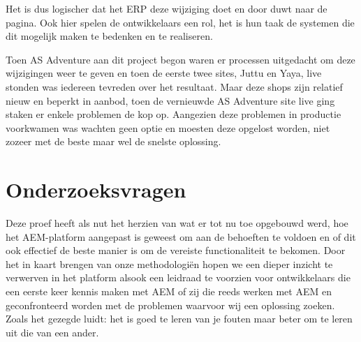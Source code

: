 	Het is dus logischer dat het ERP deze wijziging doet en door duwt naar de pagina. Ook hier spelen de ontwikkelaars een rol, het is hun taak de systemen die dit mogelijk maken te bedenken en te realiseren.
	\par
	Toen AS Adventure aan dit project begon waren er processen uitgedacht om deze wijzigingen weer te geven en toen de eerste twee sites, Juttu en Yaya, live stonden was iedereen tevreden over het resultaat. 
	Maar deze shops zijn relatief nieuw en beperkt in aanbod, toen de vernieuwde AS Adventure site live ging staken er enkele problemen de kop op. Aangezien deze problemen in productie voorkwamen was wachten geen optie en moesten deze opgelost worden, niet zozeer met de beste maar wel de snelste oplossing.
	\par
	\section{Onderzoeksvragen}
	Deze proef heeft als nut het herzien van wat er tot nu toe opgebouwd werd, hoe het AEM-platform aangepast is geweest om aan de behoeften te voldoen en of dit ook effectief de beste manier is om de vereiste functionaliteit te bekomen. 
    Door het in kaart brengen van onze methodologi\"en hopen we een dieper inzicht te verwerven in het platform alsook een leidraad te voorzien voor ontwikkelaars die een eerste keer kennis maken met AEM of zij die reeds werken met AEM en geconfronteerd worden met de problemen waarvoor wij een oplossing zoeken. 
	Zoals het gezegde luidt: het is goed te leren van je fouten maar beter om te leren uit die van een ander.
